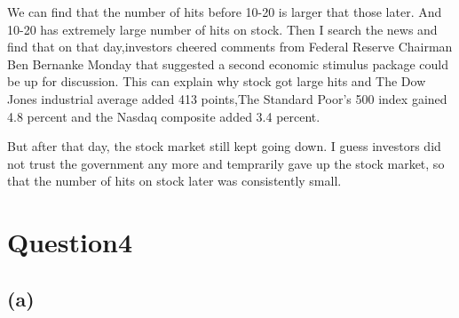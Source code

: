 \documentclass{article}\usepackage[]{graphicx}\usepackage[]{color}
\begin{document}
We can find that the number of hits before 10-20 is larger that those later. And 10-20 has extremely large number of hits on stock. Then I search the news and find that on that day,investors cheered comments from Federal Reserve Chairman Ben Bernanke Monday that suggested a second economic stimulus package could be up for discussion. This can explain why stock got large hits and The Dow Jones industrial average added 413 points,The Standard Poor's 500 index gained 4.8 percent and the Nasdaq composite added 3.4 percent.

But after that day, the stock market still kept going down. I guess investors did not trust the government any more and temprarily gave up the stock market, so that the number of hits on stock later was consistently small.

\section{Question4}
\subsection{(a)}
\end{document}
